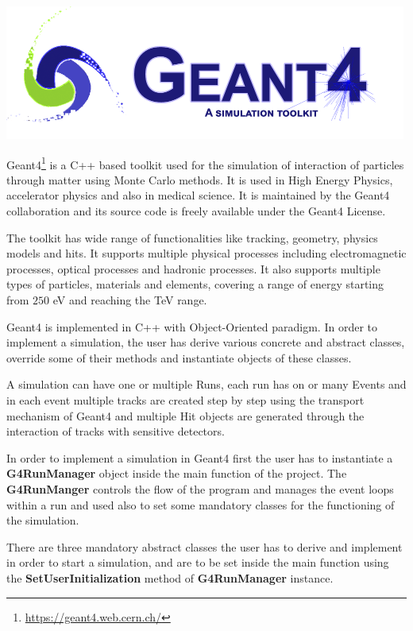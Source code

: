 \documentclass[11pt,a4paper]{report}
\begin{document}
	\begin{center}
		\includegraphics[scale=1]{imgs/g4logo.png}
	\end{center}
	Geant4\footnote{\url{https://geant4.web.cern.ch/}} is a C++ based toolkit used for the simulation of interaction of particles through matter using Monte Carlo methods. It is used in High Energy Physics, accelerator physics and also in medical science. It is maintained by the Geant4 collaboration and its source code is freely available under the Geant4 License.

	The toolkit has wide range of functionalities like tracking, geometry, physics models and hits. It supports multiple physical processes including electromagnetic processes, optical processes and hadronic processes. It also supports multiple types of particles, materials and elements, covering a range of energy starting from $250$ eV and reaching the TeV range.

	Geant4 is implemented in C++ with Object-Oriented paradigm. In order to implement a simulation, the user has derive various concrete and abstract classes, override some of their methods and instantiate objects of these classes.

	A simulation can have one or multiple Runs, each run has on or many Events and in each event multiple tracks are created step by step using the transport mechanism of Geant4 and multiple Hit objects are generated through the interaction of tracks with sensitive detectors.

	In order to implement a simulation in Geant4 first the user has to instantiate a \textbf{\color{blue}  G4RunManager} object inside the main function of the project. The \textbf{\color{blue}  G4RunManger} controls the flow of the program and manages the event loops within a run and used also to set some mandatory classes for the functioning of the simulation.

	There are three mandatory abstract classes the user has to derive and implement in order to start a simulation, and are to be set inside the main function using the \textbf{SetUserInitialization} method of \textbf{\color{blue} G4RunManager} instance.
\end{document}
